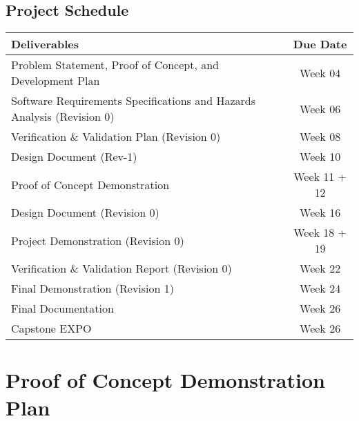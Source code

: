 \documentclass{article}
\begin{document}
\subsection{Project Schedule}
\begin{center}
  \begin{tabularx}{\textwidth}{Xc}
    \toprule
    \textbf{Deliverables} & \textbf{Due Date} \\
    \midrule
    Problem Statement, Proof of Concept, and Development Plan & Week  04 \\
    Software Requirements Specifications and Hazards Analysis (Revision 0) & Week 06 \\
    Verification \& Validation Plan (Revision 0) & Week 08 \\
    Design Document (Rev-1) & Week 10 \\
    Proof of Concept Demonstration & Week 11 + 12 \\
    Design Document (Revision 0) & Week 16 \\
    Project Demonstration (Revision 0) & Week 18 + 19 \\
    Verification \& Validation Report (Revision 0) & Week 22 \\
    Final Demonstration (Revision 1) & Week 24 \\
    Final Documentation & Week 26 \\
    Capstone EXPO & Week 26 \\
    \bottomrule
  \end{tabularx}
\end{center}

\section{Proof of Concept Demonstration Plan}
\end{document}
